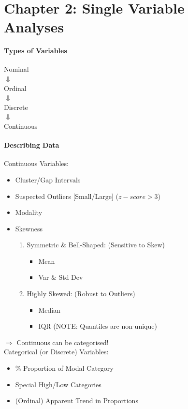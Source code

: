 \raggedright
\section{Chapter 2: Single Variable Analyses}
\paragraph{Types of Variables}
\centering
Nominal \\
$\Downarrow$\\
Ordinal \\
$\Downarrow$\\
Discrete \\
$\Downarrow$\\
Continuous 

\raggedright
\paragraph{Describing Data}
\textcolor{Bittersweet}{Continuous Variables:}
\begin{itemize}
	\item Cluster/Gap Intervals
	\item Suspected Outliers [Small/Large] ($z-score>3$)
	\item Modality
	\item Skewness
	\begin{enumerate}
		\item Symmetric \& Bell-Shaped: (Sensitive to Skew)
		\begin{itemize}
			\item Mean
			\item Var \& Std Dev
		\end{itemize}
		\item Highly Skewed: (Robust to Outliers)
		\begin{itemize}
			\item Median
			\item IQR (NOTE: Quantiles are non-unique)
		\end{itemize}
	\end{enumerate}
\end{itemize}
$\Rightarrow$ Continuous can be categorised!\\
\textcolor{Bittersweet}{Categorical (or Discrete) Variables:}
\begin{itemize}
	\item \% Proportion of Modal Category
	\item Special High/Low Categories
	\item (Ordinal) Apparent Trend in Proportions
\end{itemize}
